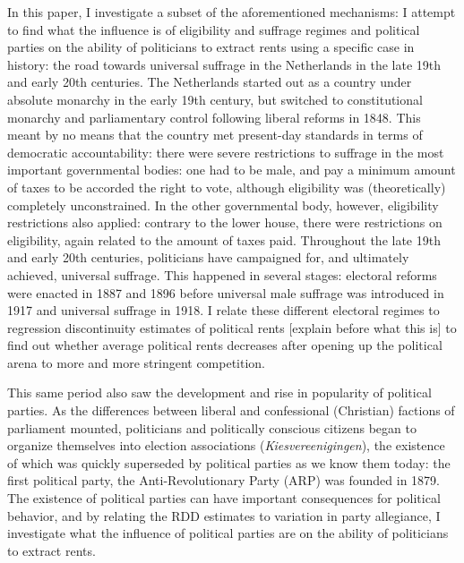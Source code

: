 \documentclass[12pt]{article}
\begin{document}
In this paper, I investigate a subset of the aforementioned mechanisms: I attempt to find what the influence is of eligibility and suffrage regimes and political parties on the ability of politicians to extract rents using a specific case in history: the road towards universal suffrage in the Netherlands in the late 19th and early 20th centuries. The Netherlands started out as a country under absolute monarchy in the early 19th century, but switched to constitutional monarchy and parliamentary control following liberal reforms in 1848. This meant by no means that the country met present-day standards in terms of democratic accountability: there were severe restrictions to suffrage in the most important governmental bodies: one had to be male, and pay a minimum amount of taxes to be accorded the right to vote, although eligibility was (theoretically) completely unconstrained. In the other governmental body, however, eligibility restrictions also applied: contrary to the lower house, there were restrictions on eligibility, again related to the amount of taxes paid. Throughout the late 19th and early 20th centuries, politicians have campaigned for, and ultimately achieved, universal suffrage. This happened in several stages: electoral reforms were enacted in 1887 and 1896 before universal male suffrage was introduced in 1917 and universal suffrage in 1918. I relate these different electoral regimes to regression discontinuity estimates of political rents [explain before what this is] to find out whether average political rents decreases after opening up the political arena to more and more stringent competition. 

This same period also saw the development and rise in popularity of political parties. As the differences between liberal and confessional (Christian) factions of parliament mounted, politicians and politically conscious citizens began to organize themselves into election associations (\textit{Kiesvereenigingen}), the existence of which was quickly superseded by political parties as we know them today: the first political party, the Anti-Revolutionary Party (ARP) was founded in 1879. The existence of political parties can have important consequences for political behavior, and by relating the RDD estimates to variation in party allegiance, I investigate what the influence of political parties are on the ability of politicians to extract rents. 
\end{document}
